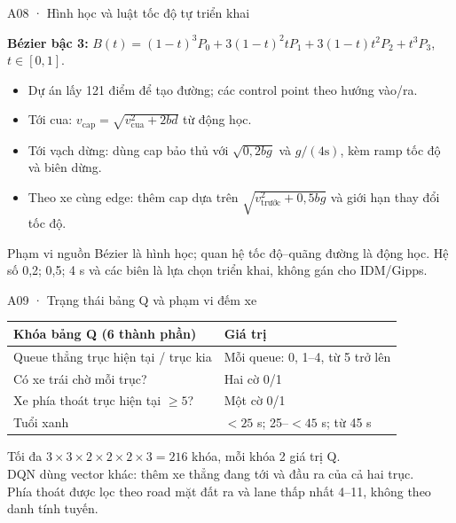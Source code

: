 \documentclass[aspectratio=169,10pt]{beamer}
\begin{document}
\begin{frame}{A08 · Hình học và luật tốc độ tự triển khai}
\relax

\small
\textbf{Bézier bậc 3:}\quad
$B(t)=(1-t)^3P_0+3(1-t)^2tP_1+3(1-t)t^2P_2+t^3P_3$, $t\in[0,1]$.
\begin{itemize}
\item Dự án lấy 121 điểm để tạo đường; các control point theo hướng vào/ra.
\item Tới cua: $v_{\mathrm{cap}}=\sqrt{v_{\mathrm{cua}}^2+2bd}$ từ động học.
\item Tới vạch dừng: dùng cap bảo thủ với $\sqrt{0,2bg}$ và $g/(4\mathrm{s})$, kèm ramp tốc độ và biên dừng.
\item Theo xe cùng edge: thêm cap dựa trên $\sqrt{v_{\mathrm{trước}}^2+0,5bg}$ và giới hạn thay đổi tốc độ.
\end{itemize}
\begin{block}{Phạm vi nguồn}
Bézier là hình học; quan hệ tốc độ–quãng đường là động học. Hệ số 0,2; 0,5; 4 s và các biên là lựa chọn triển khai, không gán cho IDM/Gipps.
\end{block}

\end{frame}
\begin{frame}{A09 · Trạng thái bảng Q và phạm vi đếm xe}
\relax

\small
\begin{tabular}{@{}P{6.4cm}P{5.8cm}@{}}\toprule
Khóa bảng Q (6 thành phần) & Giá trị\\\midrule
Queue thẳng trục hiện tại / trục kia & Mỗi queue: 0, 1–4, từ 5 trở lên\\
Có xe trái chờ mỗi trục? & Hai cờ 0/1\\
Xe phía thoát trục hiện tại $\ge5$? & Một cờ 0/1\\
Tuổi xanh & $<25$ s; 25–$<45$ s; từ 45 s\\\bottomrule\end{tabular}\par
\vspace{.3cm}
Tối đa $3\times3\times2\times2\times2\times3=216$ khóa, mỗi khóa 2 giá trị Q.\\[.2cm]
DQN dùng vector khác: thêm xe thẳng đang tới và đầu ra của cả hai trục.\\[.2cm]
Phía thoát được lọc theo road mặt đất ra và lane thấp nhất 4–11, không theo danh tính tuyến.

\end{frame}
\end{document}
